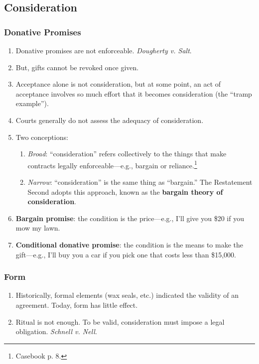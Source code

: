 \subsection{Consideration}

\subsubsection{Donative Promises}

\begin{enumerate}
    \item Donative promises are not enforceable. \emph{Dougherty v. Salt}.
    \item But, gifts cannot be revoked once given.
    \item Acceptance alone is not consideration, but at some point, an act of 
    acceptance involves so much effort that it becomes consideration (the 
    ``tramp example'').
    \item Courts generally do not assess the adequacy of consideration.
    \item Two conceptions:
    \begin{enumerate}
        \item \emph{Broad}: ``consideration'' refers collectively to the 
        things that make contracts legally enforceable---e.g., bargain or 
        reliance.\footnote{Casebook p. 8.}
        \item \emph{Narrow}: ``consideration'' is the same thing as 
        ``bargain.'' The Restatement Second adopts this approach, known as the 
        \textbf{bargain theory of consideration}.
    \end{enumerate}
    \item \textbf{Bargain promise}: the condition is the price---e.g., I'll 
    give you \$20 if you mow my lawn.
    \item \textbf{Conditional donative promise}: the condition is the means 
    to make the gift---e.g., I'll buy you a car if you pick one that costs 
    less than \$15,000.
\end{enumerate}

\subsubsection{Form}

\begin{enumerate}
    \item Historically, formal elements (wax seals, etc.) indicated the 
    validity of an agreement. Today, form has little effect.
    \item Ritual is not enough. To be valid, consideration must impose a legal 
    obligation. \emph{Schnell v. Nell}.
\end{enumerate}

